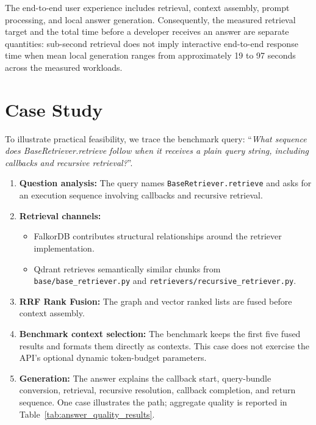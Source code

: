 \documentclass[12pt,letterpaper,oneside]{report}
\begin{document}
The end-to-end user experience includes retrieval, context assembly, prompt processing, and local answer generation. Consequently, the measured retrieval target and the total time before a developer receives an answer are separate quantities: sub-second retrieval does not imply interactive end-to-end response time when mean local generation ranges from approximately 19 to 97 seconds across the measured workloads.

\section{Case Study}
To illustrate practical feasibility, we trace the benchmark query: ``\textit{What sequence does BaseRetriever.retrieve follow when it receives a plain query string, including callbacks and recursive retrieval?}''.

\begin{enumerate}
    \item \textbf{Question analysis:} The query names \texttt{BaseRetriever.retrieve} and asks for an execution sequence involving callbacks and recursive retrieval.
    \item \textbf{Retrieval channels:}
    \begin{itemize}
        \item FalkorDB contributes structural relationships around the retriever implementation.
        \item Qdrant retrieves semantically similar chunks from \texttt{base/base\_retriever.py} and \texttt{retrievers/recursive\_retriever.py}.
    \end{itemize}
    \item \textbf{RRF Rank Fusion:} The graph and vector ranked lists are fused before context assembly.
    \item \textbf{Benchmark context selection:} The benchmark keeps the first five fused results and formats them directly as contexts. This case does not exercise the API's optional dynamic token-budget parameters.
    \item \textbf{Generation:} The answer explains the callback start, query-bundle conversion, retrieval, recursive resolution, callback completion, and return sequence. One case illustrates the path; aggregate quality is reported in Table~\ref{tab:answer_quality_results}.
\end{enumerate}

\newpage

\end{document}
